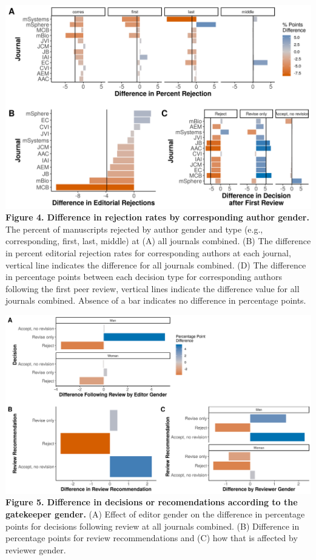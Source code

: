 \documentclass[11pt,]{article}
\begin{document}
\includegraphics{Figure_4.png} \textbf{Figure 4. Difference in rejection
rates by corresponding author gender.} The percent of manuscripts
rejected by author gender and type (e.g., corresponding, first, last,
middle) at (A) all journals combined. (B) The difference in percent
editorial rejection rates for corresponding authors at each journal,
vertical line indicates the difference for all journals combined. (D)
The difference in percentage points between each decision type for
corresponding authors following the first peer review, vertical lines
indicate the difference value for all journals combined. Absence of a
bar indicates no difference in percentage points.

\newpage

\includegraphics{Figure_5.png} \textbf{Figure 5. Difference in decisions
or recomendations according to the gatekeeper gender.} (A) Effect of
editor gender on the difference in percentage points for decisions
following review at all journals combined. (B) Difference in percentage
points for review recommendations and (C) how that is affected by
reviewer gender.
\end{document}
